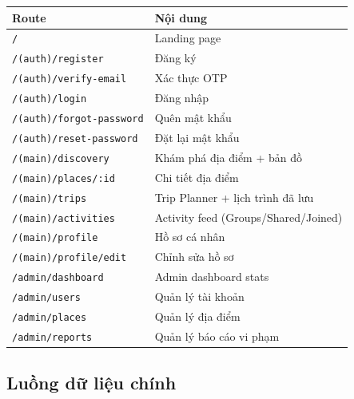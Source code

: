 \documentclass[12pt,a4paper]{article}
\begin{document}
\begin{center}
\begin{tabular}{ll}
  \toprule
  \textbf{Route} & \textbf{Nội dung} \\
  \midrule
  \texttt{/}                   & Landing page \\
  \texttt{/(auth)/register}    & Đăng ký \\
  \texttt{/(auth)/verify-email} & Xác thực OTP \\
  \texttt{/(auth)/login}       & Đăng nhập \\
  \texttt{/(auth)/forgot-password} & Quên mật khẩu \\
  \texttt{/(auth)/reset-password}  & Đặt lại mật khẩu \\
  \texttt{/(main)/discovery}   & Khám phá địa điểm + bản đồ \\
  \texttt{/(main)/places/:id}  & Chi tiết địa điểm \\
  \texttt{/(main)/trips}       & Trip Planner + lịch trình đã lưu \\
  \texttt{/(main)/activities}  & Activity feed (Groups/Shared/Joined) \\
  \texttt{/(main)/profile}     & Hồ sơ cá nhân \\
  \texttt{/(main)/profile/edit} & Chỉnh sửa hồ sơ \\
  \texttt{/admin/dashboard}    & Admin dashboard stats \\
  \texttt{/admin/users}        & Quản lý tài khoản \\
  \texttt{/admin/places}       & Quản lý địa điểm \\
  \texttt{/admin/reports}      & Quản lý báo cáo vi phạm \\
  \bottomrule
\end{tabular}
\end{center}

\subsection{Luồng dữ liệu chính}
\end{document}
